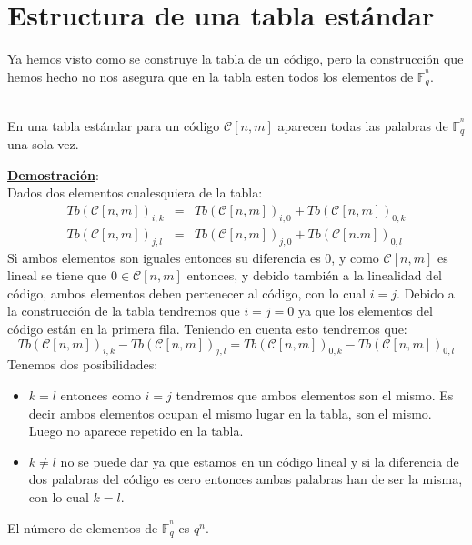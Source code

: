 %
%

\section{Estructura de una tabla est\'andar}

Ya hemos visto como se construye la tabla de un c\'odigo, pero la 
cons\-tru\-cci\'on que hemos hecho no nos asegura que en la tabla esten todos 
los elementos de $\mathbb{F}^{^n}_q$.
%
%
\begin{teorema}
\ \\
En una tabla est\'andar para un c\'odigo $\mathcal{C}[n,m]$ aparecen todas las
palabras de $\mathbb{F}^{^n}_q$ una sola vez.
\end{teorema}
\underline{\textbf{Demostraci\'on}}:\\
Dados dos elementos cualesquiera de la tabla:
\begin{eqnarray*}
Tb(\mathcal{C}[n,m])_{i,k}&=&Tb(\mathcal{C}[n,m])_{i,0}+
Tb(\mathcal{C}[n,m])_{0,k}\\
Tb(\mathcal{C}[n,m])_{j,l}&=&Tb(\mathcal{C}[n,m])_{j,0}+
Tb(\mathcal{C}[n.m])_{0,l}
\end{eqnarray*}
S\'{\i} ambos elementos son iguales entonces su diferencia es $0$, y como
$\mathcal{C}[n,m]$ es lineal se tiene que $0\in \mathcal{C}[n,m]$ entonces,
y debido tambi\'en a la linealidad del c\'odigo, ambos elementos deben
pertenecer al c\'odigo, con lo cual $i=j$. Debido a la construcci\'on de la
tabla tendremos que $i=j=0$ ya que los elementos del c\'odigo est\'an en la
primera fila. Teniendo en cuenta esto tendremos que:
\begin{displaymath}
Tb(\mathcal{C}[n,m])_{i,k}-Tb(\mathcal{C}[n,m])_{j,l} =
Tb(\mathcal{C}[n,m])_{0,k}-Tb(\mathcal{C}[n,m])_{0,l}
\end{displaymath}
Tenemos dos posibilidades:
\begin{itemize}
\item $k=l$ entonces como $i=j$ tendremos que ambos elementos son el mismo. Es
decir ambos elementos ocupan el mismo lugar en la tabla, son el mismo. Luego no
aparece repetido en la tabla.
\item $k\neq l$ no se puede dar ya que estamos en un c\'odigo lineal y si la
diferencia de dos palabras del c\'odigo es cero entonces ambas palabras han de
ser la misma, con lo cual $k=l$.
\end{itemize}
El n\'umero de elementos de $\mathbb{F}^{^n}_q$ es $q^n$.\\ \\
